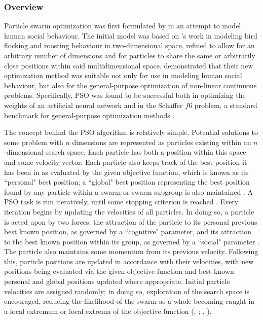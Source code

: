 \documentclass[12pt,a4paper]{article}
\begin{document}
\subsubsection{Overview}
Particle swarm optimization was first formulated by \cite{kennedy1995} in an attempt to model human social behaviour. The initial model was based on \cite{heppner1990}'s work in modeling bird flocking and roosting behaviour in two-dimensional space, refined to allow for an arbitrary number of dimensions and for particles to share the same or arbitrarily close positions within said multidimensional space. \citeauthor{kennedy1995} demonstrated that their new optimization method was suitable not only for use in modeling human social behaviour, but also for the general-purpose optimization of non-linear continuous problems. Specifically, PSO was found to be successful both in optimizing the weights of an artificial neural network and in the Schaffer $f6$ problem, a standard benchmark for general-purpose optimization methods \citep{davis1991}.

The concept behind the PSO algorithm is relatively simple. Potential solutions to some problem with $n$ dimensions are represented as particles existing within an $n$-dimensional search space. Each particle has both a position within this space and some velocity vector. Each particle also keeps track of the best position it has been in as evaluated by the given objective function, which is known as its ``personal" best position; a ``global" best position representing the best position found by any particle within a swarm or swarm subgroup is also maintained \citep{chong2013}. A PSO task is run iteratively, until some stopping criterion is reached \citep{solnon2010}. Every iteration begins by updating the velocities of all particles. In doing so, a particle is acted upon by two forces: the attraction of the particle to its personal previous best known position, as governed by a ``cognitive" parameter, and its attraction to the best known position within its group, as governed by a ``social" parameter \citep{chong2013}. The particle also maintains some momentum from its previous velocity. Following this, particle positions are updated in accordance with their velocities, with new positions being evaluated via the given objective function and best-known personal and global positions updated where appropriate. Initial particle velocities are assigned randomly; in doing so, exploration of the search space is encouraged, reducing the likelihood of the swarm as a whole becoming caught in a local extremum or local extrema of the objective function (\citeauthor{yang2014}, \citeyear{yang2014}; \citeauthor{solnon2010}, \citeyear{solnon2010}). 
\end{document}
